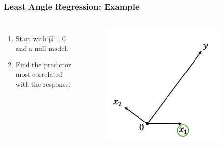 \begin{frame}
\frametitle{Least Angle Regression: Example}
\begin{columns}[t]
    \begin{enumerate}
        \item Start with $\hat{\mathbf{\mu}}=0$ and a null model.
        \item Find the predictor most correlated with the response.
    \end{enumerate}
    
    \begin{figure}[!htbp]
        \begin{center}
            \includegraphics[width=0.9\textwidth]{img/LAR/2.jpeg}
        \end{center}
    \end{figure}
\end{columns}
\end{frame}

